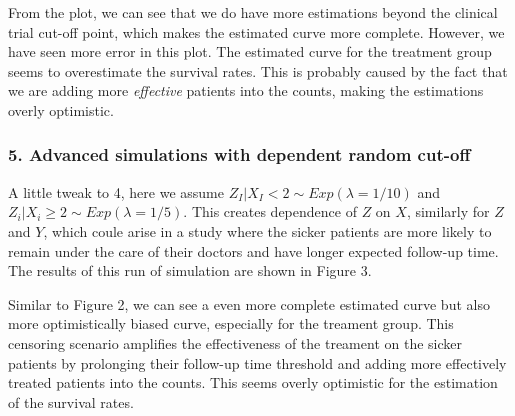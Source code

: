 \documentclass{article}
\begin{document}
From the plot, we can see that we do have more estimations beyond the
clinical trial cut-off point, which makes the estimated curve more
complete. However, we have seen more error in this plot. The estimated
curve for the treatment group seems to overestimate the survival
rates. This is probably caused by the fact that we are adding more
\textit{effective} patients into the counts, making the estimations
overly optimistic.


\subsubsection*{5. Advanced simulations with dependent random cut-off}
\hspace{12 pt} A little tweak to 4, here we assume 
$Z_I|X_I < 2 \sim Exp(\lambda = 1/10)$ and $Z_i|X_i \geq 2 \sim Exp(\lambda = 1/5)$. \newline
This creates dependence of $Z$ on $X$, similarly for $Z$ and $Y$,
which coule arise in a study where the sicker patients are more likely
to remain under the care of their doctors and have longer expected
follow-up time. The results of this run of simulation are shown in
Figure 3.

Similar to Figure 2, we can see a even more complete estimated curve
but also more optimistically biased curve, especially for the treament
group. This censoring scenario amplifies the effectiveness of the
treament on the sicker patients by prolonging their follow-up time
threshold and adding more effectively treated patients into the
counts. This seems overly optimistic for the estimation of the
survival rates.
\end{document}
